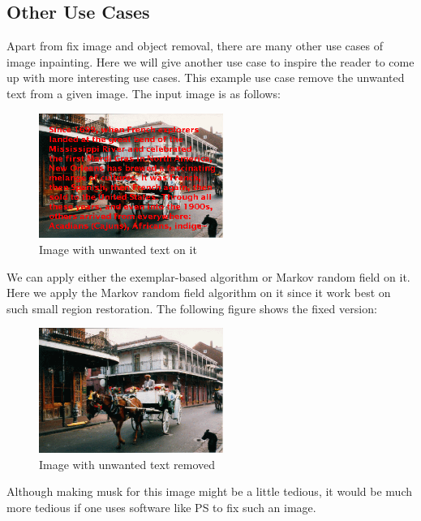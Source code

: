 \subsection{Other Use Cases}
Apart from fix image and object removal, there are many other use cases of image inpainting. Here we will give another use case to inspire the reader to come up with more interesting use cases. This example use case remove the unwanted text from a given image. The input image is as follows:
\begin{figure}[H]
\centering
\includegraphics[width=6cm]{hc.png}
\caption{Image with unwanted text on it}
\end{figure}
We can apply either the exemplar-based algorithm or Markov random field on it. Here we apply the Markov random field algorithm on it since it work best on such small region restoration. The following figure shows the fixed version:
\begin{figure}[H]
\centering
\includegraphics[width=6cm]{hc_res.png}
\caption{Image with unwanted text removed}
\end{figure}
Although making musk for this image might be a little tedious, it would be much more tedious if one uses software like PS to fix such an image.